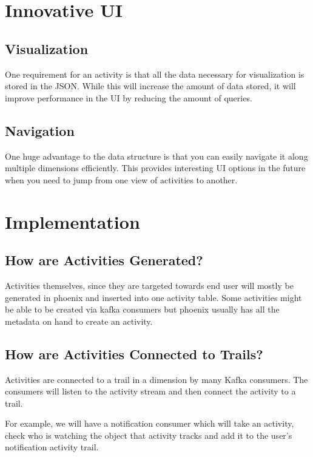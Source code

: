 \documentclass[11pt]{article}
\begin{document}
\section{Innovative UI}
\subsection{Visualization}

One requirement for an activity is that all the data necessary for visualization is stored
in the JSON. While this will increase the amount of data stored, it will improve performance
in the UI by reducing the amount of queries. 

\subsection{Navigation}

One huge advantage to the data structure is that you can easily navigate it along multiple
dimensions efficiently. This provides interesting UI options in the future when you need
to jump from one view of activities to another.

\section{Implementation}


\subsection{How are Activities Generated?}

Activities themselves, since they are targeted towards end user will mostly be generated
in phoenix and inserted into one activity table. Some activities might be able to 
be created via kafka consumers but phoenix usually has all the metadata on hand
to create an activity.

\subsection{How are Activities Connected to Trails?}

Activities are connected to a trail in a dimension by many Kafka consumers. The consumers
will listen to the activity stream and then connect the activity to a trail.

For example, we will have a notification consumer which will take an activity, check who
is watching the object that activity tracks and add it to the user's notification activity trail.
\end{document}

